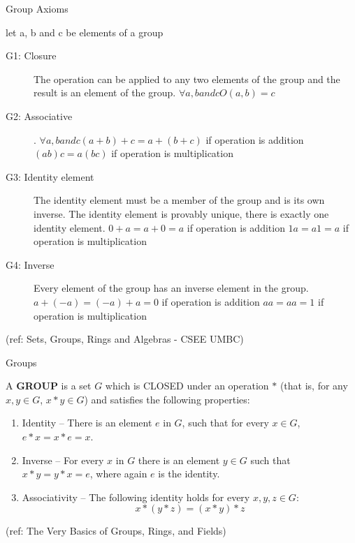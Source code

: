 \begin{frame}{Group Axioms}

let a, b and c be elements of a group

\begin{description}
\item[G1: Closure] The operation can be applied to any two elements of the group
        and the result is an element of the group.
        $\forall a, b and c  O(a,b)=c$
	
\item[G2: Associative].
        $\forall a, b and c  (a+b)+c = a+(b+c)$ if operation is addition
                            $(ab)c = a(bc)$ if operation is multiplication 

\item[G3: Identity element]
        The identity element must be a member of the group and is 
        its own inverse. The identity element is provably unique,
        there is exactly one identity element.
        $0+a=a+0=a$ if operation is addition
        $1a=a1=a$ if operation is multiplication

\item[G4: Inverse]
        Every element of the group has an inverse element in the group.
        $a+(-a) = (-a)+a = 0$ if operation is addition
        $aa  = a  a = 1$ if operation is multiplication	
\end{description}

\tiny{(ref: Sets, Groups, Rings and Algebras - CSEE UMBC)}

\end{frame}

\begin{frame}{Groups}
\begin{Definition} A {\bf GROUP} is a set $G$ which is CLOSED under an operation $\ast$ (that is, for any $x,y \in G$, $x \ast y \in G$) and satisfies the following properties:
\begin{enumerate}
\item Identity -- There is an element $e$ in $G$, such that for every $x \in G$, $e \ast x = x \ast e = x$.
\item Inverse -- For every $x$ in $G$ there is an element $y \in G$ such that $x \ast y = y \ast x = e$, where again $e$ is the identity.
\item Associativity -- The following identity holds for every $x,y,z \in G$:
$$ x \ast (y \ast z) = (x \ast y) \ast z $$
\end{enumerate}
\end{Definition}


\tiny{(ref: The Very Basics of Groups, Rings, and Fields)}

\end{frame}


